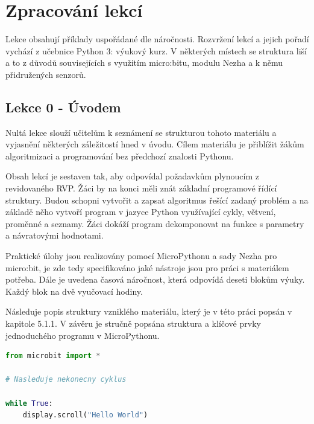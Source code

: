 \documentclass[
  digital,     %
  oneside,     %
  nosansbold,  %
  colorbold, %
  lof,         %
  nolot,         %
]{fithesis4}
\begin{document}
\section{Zpracování lekcí}

Lekce obsahují příklady uspořádané dle náročnosti. Rozvržení lekcí a jejich pořadí vychází z učebnice Python 3: výukový kurz. %
V některých místech se struktura liší a to z důvodů souvisejících s využitím micro:bitu, modulu Nezha a k němu přidružených senzorů. 

\subsection{Lekce 0 - Úvodem} %
Nultá lekce slouží učitelům k seznámení se strukturou tohoto materiálu a vyjasnění některých záležitostí hned v úvodu. Cílem materiálu je přiblížit žákům algoritmizaci a programování bez předchozí znalosti Pythonu. 

Obsah lekcí je sestaven tak, aby odpovídal požadavkům plynoucím z revidovaného RVP. Žáci by na konci měli znát základní programové řídící struktury. Budou schopni vytvořit a zapsat algoritmus řešící zadaný problém a na základě něho vytvoří program v jazyce Python využívající cykly, větvení, proměnné a seznamy. Žáci dokáží program dekomponovat na funkce s parametry a návratovými hodnotami.

Praktické úlohy jsou realizovány pomocí MicroPythonu a sady Nezha pro micro:bit, je zde tedy specifikováno jaké nástroje jsou pro práci s materiálem potřeba. Dále je uvedena časová náročnost, která odpovídá deseti blokům výuky. Každý blok na dvě vyučovací hodiny.

Následuje popis struktury vzniklého materiálu, který je v této práci popsán v kapitole 5.1.1. V závěru je stručně popsána struktura a klíčové prvky jednoduchého programu v MicroPythonu. 
\begin{lstlisting}[language=Python, caption=struktura programu v MicroPythonu]
from microbit import *

# Nasleduje nekonecny cyklus

while True:
    display.scroll("Hello World")
\end{lstlisting}
\end{document}
